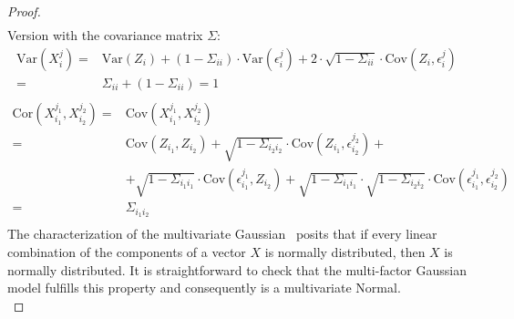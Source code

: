 \documentclass[11pt,fleqn]{book} %
\begin{document}
\begin{proof}
\begin{displaymath}
\begin{array}{rl}
		\end{array}
	\end{displaymath}
	Version with the covariance matrix $\Sigma$:
	\begin{displaymath}
		\begin{array}{rl}
			\text{Var}(X_i^j) =                       &
			\text{Var}(Z_i) + (1-\Sigma_{ii}) \cdot \text{Var}(\epsilon_i^j) +
			2 \cdot \sqrt{1-\Sigma_{ii}} \cdot \text{Cov}(Z_i, \epsilon_i^j)               \\
			=                                         & \Sigma_{ii} + (1-\Sigma_{ii}) = 1  \\
		\end{array}
	\end{displaymath}
	\begin{displaymath}
		\begin{array}{rl}
			\text{Cor}(X_{i_1}^{j_1},X_{i_2}^{j_2}) = & \text{Cov}(X_{i_1}^{j_1},X_{i_2}^{j_2})                                        \\
			=                                         & \text{Cov}(Z_{i_1},Z_{i_2}) +
			                                            \sqrt{1-\Sigma_{i_2i_2}} \cdot \text{Cov}(Z_{i_1}, \epsilon_{i_2}^{j_2}) +     \\
			                                          & + \sqrt{1-\Sigma_{i_1i_1}} \cdot \text{Cov}(\epsilon_{i_1}^{j_1}, Z_{i_2}) +
			                                            \sqrt{1-\Sigma_{i_1i_1}} \cdot \sqrt{1-\Sigma_{i_2i_2}} \cdot 
			                                            \text{Cov}(\epsilon_{i_1}^{j_1}, \epsilon_{i_2}^{j_2})                         \\
			=                                         & \Sigma_{i_1i_2}                                                                \\
		\end{array}
	\end{displaymath}
	The characterization of the multivariate Gaussian~\cite[thm. 2.6.2]{anderson:1984}
	posits that if every linear combination of the components of a 
	vector $X$ is normally distributed, then $X$ is normally distributed.
	It is straightforward to check that the multi-factor Gaussian model 
	fulfills this property and consequently is a multivariate Normal.
	\\
\end{proof}
\end{document}
